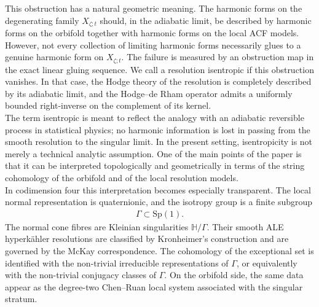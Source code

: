 \documentclass[psamsfonts]{amsart}
\theoremstyle{plain}
\theoremstyle{definition}{
\newtheorem{defi}{Definition}[section]
\newtheorem{ass}{Assumption}
\newtheorem*{nota}{Notation}}
\theoremstyle{remark}{
\newtheorem{rem}{Remark}
\newtheorem{ex}{Example}}
\theoremstyle{plain}{
\newtheorem{thm}{Theorem}[section]
\newtheorem{lem}{Lemma}[section]
\newtheorem{cor}{Corollary}[section]
\newtheorem{prop}{Proposition}[section]
\newtheorem{con}{Conjecture}[section]}
\newcommand{\m}[1]{{\mathrm{#1}}}
\begin{document}
This obstruction has a natural geometric meaning. The harmonic forms on the degenerating family $X_{\zeta;t}$ should, in the adiabatic limit, be described by harmonic forms on the orbifold together with harmonic forms on the local ACF models. However, not every collection of limiting harmonic forms necessarily glues to a genuine harmonic form on $X_{\zeta;t}$. The failure is measured by an obstruction map in the exact linear gluing sequence. We call a resolution isentropic if this obstruction vanishes. In that case, the Hodge theory of the resolution is completely described by its adiabatic limit, and the Hodge--de Rham operator admits a uniformly bounded right-inverse on the complement of its kernel.\\

The term isentropic is meant to reflect the analogy with an adiabatic reversible process in statistical physics; no harmonic information is lost in passing from the smooth resolution to the singular limit. In the present setting, isentropicity is not merely a technical analytic assumption. One of the main points of the paper is that it can be interpreted topologically and geometrically in terms of the string cohomology of the orbifold and of the local resolution models.\\

In codimension four this interpretation becomes especially transparent. The local normal representation is quaternionic, and the isotropy group is a finite subgroup
\begin{align*}
\Gamma \subset \m{Sp}(1).
\end{align*}
The normal cone fibres are Kleinian singularities $\mathbb {H}/\Gamma$. Their smooth ALE hyperkähler resolutions are classified by Kronheimer's construction \cite{kronheimer1989construction,kronheimer} and are governed by the McKay correspondence. The cohomology of the exceptional set is identified with the non-trivial irreducible representations of $\Gamma$, or equivalently with the non-trivial conjugacy classes of $\Gamma$. On the orbifold side, the same data appear as the degree-two Chen--Ruan local system associated with the singular stratum.\\
\end{document}
